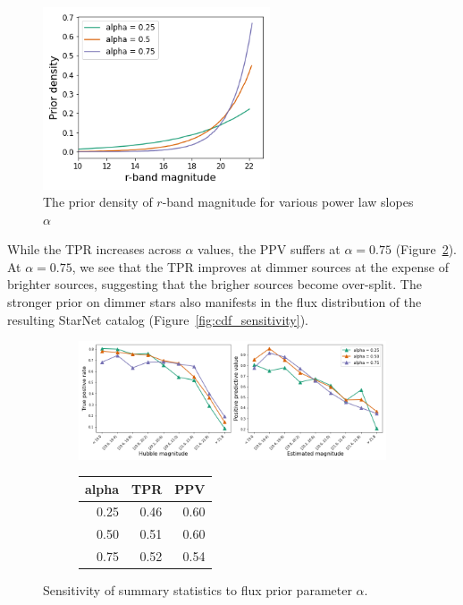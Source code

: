 \begin{figure}[!h]
    \centering
    \includegraphics[width = 0.6\textwidth]{figures/prior_sensitivity/prior_fluxes.png}
    \caption{The prior density of $r$-band magnitude for various power law slopes $\alpha$}
    \label{fig:flux_priors}
\end{figure}

While the TPR increases across $\alpha$ values, the PPV suffers at $\alpha = 0.75$ (Figure~\ref{fig:alpha_sensitivity}).
At $\alpha = 0.75$, we see that the TPR improves at dimmer sources at the expense of brighter sources, suggesting that the brigher sources become over-split. 
The stronger prior on dimmer stars also manifests in the flux distribution of the resulting StarNet catalog (Figure~\ref{fig:cdf_sensitivity}). 

\begin{figure}[ht]
\begin{subfigure}{\textwidth}
\centering
\includegraphics[width = \textwidth]{figures/prior_sensitivity/prior_alpha_sensitivity.png}
\end{subfigure}
\begin{subfigure}{\textwidth}
\begin{center}
\begin{tabular}{rrr}
\toprule
 alpha &   TPR &   PPV \\
\midrule
  0.25 &  0.46 &  0.60 \\
  0.50 &  0.51 &  0.60 \\
  0.75 &  0.52 &  0.54 \\
\bottomrule
\end{tabular}
\par\vspace{0pt}
\end{center}
\end{subfigure}\hfill
\caption{Sensitivity of summary statistics to flux prior parameter $\alpha$. }
\label{fig:alpha_sensitivity}
\end{figure}

